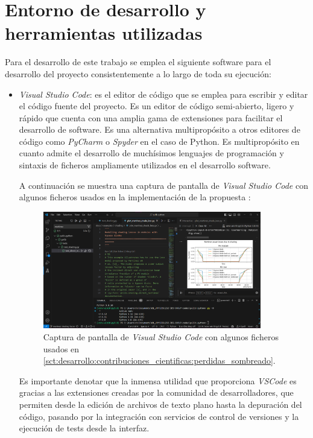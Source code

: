 \section{Entorno de desarrollo y herramientas utilizadas} \label{sct:desarrollo:entorno}

Para el desarrollo de este trabajo se emplea el siguiente software para el desarrollo del proyecto consistentemente a lo largo de toda su ejecución:

\begin{itemize}
    \item \textit{Visual Studio Code}: es el editor de código que se emplea para escribir y editar el código fuente del proyecto. Es un editor de código semi-abierto, ligero y rápido que cuenta con una amplia gama de extensiones para facilitar el desarrollo de software. Es una alternativa multipropósito a otros editores de código como \textit{PyCharm} o \textit{Spyder} en el caso de Python. Es multipropósito en cuanto admite el desarrollo de muchísimos lenguajes de programación y sintaxis de ficheros ampliamente utilizados en el desarrollo software.

          A continuación se muestra una captura de pantalla de \textit{Visual Studio Code} con algunos ficheros usados en la implementación de la propuesta :

          \begin{figure}[H]
              \centering
              \includegraphics[width=0.9\textwidth]{./images/SoA_foss/VSCode.png}
              \caption{Captura de pantalla de \textit{Visual Studio Code} con algunos ficheros usados en \ref{sct:desarrollo:contribuciones_cientificas:perdidas_sombreado}.}
              \label{fig:vscode}
          \end{figure}

          Es importante denotar que la inmensa utilidad que proporciona \textit{VSCode} es gracias a las extensiones creadas por la comunidad de desarrolladores, que permiten desde la edición de archivos de texto plano hasta la depuración del código, pasando por la integración con servicios de control de versiones y la ejecución de tests desde la interfaz.


\end{itemize}
